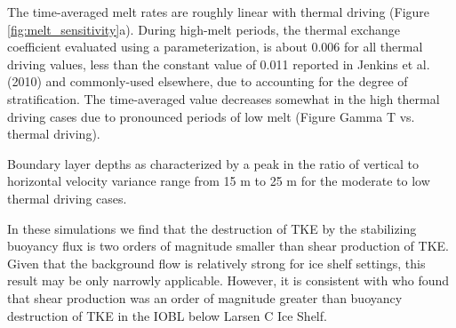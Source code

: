 \documentclass[draft]{styles/agujournal2019}
\begin{document}
The time-averaged melt rates are roughly linear with thermal driving (Figure \ref{fig:melt_sensitivity}a). During high-melt periods, the thermal exchange coefficient evaluated using a parameterization, is about 0.006 for all thermal driving values, less than the constant value of 0.011 reported in Jenkins et al. (2010) and commonly-used elsewhere, due to accounting for the degree of stratification. The time-averaged value decreases somewhat in the high thermal driving cases due to pronounced periods of low melt (Figure Gamma T vs. thermal driving). 

Boundary layer depths as characterized by a peak in the ratio of vertical to horizontal velocity variance range from 15 m to 25 m for the moderate to low thermal driving cases.

In these simulations we find that the destruction of TKE by the stabilizing buoyancy flux is two orders of magnitude smaller than shear production of TKE. Given that the background flow is relatively strong for ice shelf settings, this result may be only narrowly applicable. However, it is consistent with \citep{davis_nicholls} who found that shear production was an order of magnitude greater than buoyancy destruction of TKE in the IOBL below Larsen C Ice Shelf. 



\end{document}
